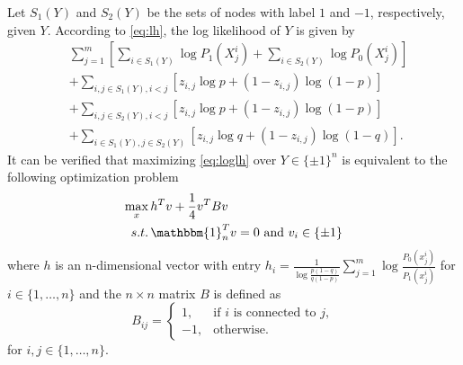 \documentclass[conference]{IEEEtran}
\begin{document}
	Let $S_1(Y)$ and $S_2(Y)$ be the sets of nodes with label $1$ and $-1$, respectively, given $Y$.
	According to \eqref{eq:lh}, the log likelihood of $Y$ is given by
	\begin{align}\label{eq:loglh}
		&\sum^m_{j=1}[\sum_{i\in S_1(Y)} \log P_1(X^i_{j})+\sum_{i\in S_2(Y)} \log P_0(X^i_{j})]\nonumber\\
		&+\sum_{i,j\in S_1(Y),i<j}[z_{i,j}\log p+(1-z_{i,j})\log (1-p)]\nonumber\\
		&+\sum_{i,j\in S_2(Y),i<j}[z_{i,j}\log p+(1-z_{i,j})\log (1-p)]
		\nonumber\\
		&+\sum_{i\in S_1(Y),j\in S_2(Y)}[z_{i,j}\log q+(1-z_{i,j})\log (1-q)].
	\end{align}
	It can be verified that maximizing \eqref{eq:loglh} over $Y\in\{\pm 1\}^n$ is equivalent to the following optimization problem
	\begin{align}
		\max_{x}\, & h^T v + \frac{1}{4}v^T B v \notag \\
		s.t.\, & \mathbbm{1}_n^T v = 0 \text{ and } v_i \in \{\pm 1 \} \label{eq:matrix_mle}
	\end{align}
	where $h$ is an n-dimensional vector with entry $h_i = \frac{1}{\log \frac{p(1-q)}{q(1-p)}}\sum_{j=1}^m \log \frac{P_0(x^i_{j})}{P_1(x^i_{j})}$ for $i\in\{1,\ldots,n\}$ and the $n\times n $ matrix $B$ is defined as
	\begin{equation}
		B_{ij} = \begin{cases}
			1, & \text{if $i$ is connected to $j$}, \\
			-1,& \text{otherwise.}
		\end{cases}
	\end{equation}  
	for $i,j\in\{1,\ldots,n\}$.
	
\end{document}
